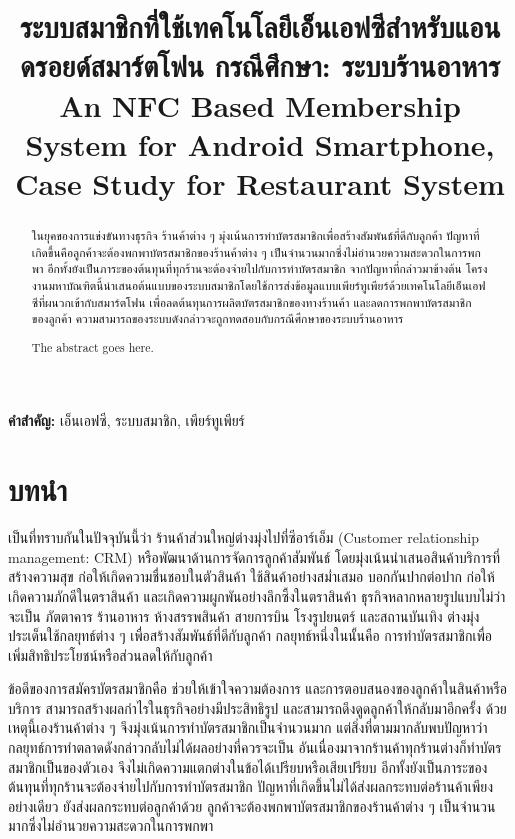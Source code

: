 \documentclass[12pt,a4paper,twocolumn]{article}
\title{ระบบสมาชิกที่ใช้เทคโนโลยีเอ็นเอฟซีสำหรับแอนดรอยด์สมาร์ตโฟน กรณีศึกษา: ระบบร้านอาหาร\\An NFC Based Membership System for Android Smartphone,\\Case Study for Restaurant System}
\author{}
\date{}
\renewcommand\abstractname{บทคัดย่อ}
\begin{document}
\maketitle
\thispagestyle{empty}
\pagestyle{empty}

\begin{abstract}
ในยุคของการแข่งขันทางธุรกิจ ร้านค้าต่าง ๆ มุ่งเน้นการทำบัตรสมาชิกเพื่อสร้างสัมพันธ์ที่ดีกับลูกค้า ปัญหาที่เกิดขึ้นคือลูกค้าจะต้องพกพาบัตรสมาชิกของร้านค้าต่าง ๆ เป็นจำนวนมากซึ่งไม่อำนวยความสะดวกในการพกพา อีกทั้งยังเป็นภาระของต้นทุนที่ทุกร้านจะต้องจ่ายไปกับการทำบัตรสมาชิก จากปัญหาที่กล่าวมาข้างต้น โครงงานมหาบัณฑิตนี้นำเสนอต้นแบบของระบบสมาชิกโดยใช้การส่งข้อมูลแบบเพียร์ทูเพียร์ด้วยเทคโนโลยีเอ็นเอฟซีที่ผนวกเข้ากับสมาร์ตโฟน เพื่อลดต้นทุนการผลิตบัตรสมาชิกของทางร้านค้า และลดการพกพาบัตรสมาชิกของลูกค้า ความสามารถของระบบดังกล่าวจะถูกทดสอบกับกรณีศึกษาของระบบร้านอาหาร
\end{abstract}

\renewcommand\abstractname{Abstract}
\begin{abstract}
The abstract goes here.
\end{abstract}

\noindent \textbf{คำสำคัญ:} เอ็นเอฟซี, ระบบสมาชิก, เพียร์ทูเพียร์


\section{บทนำ}
เป็นที่ทราบกันในปัจจุบันนี้ว่า ร้านค้าส่วนใหญ่ต่างมุ่งไปที่ซีอาร์เอ็ม (Customer relationship management: CRM) หรือพัฒนาด้านการจัดการลูกค้าสัมพันธ์ โดยมุ่งเน้นนำเสนอสินค้าบริการที่สร้างความสุข ก่อให้เกิดความชื่นชอบในตัวสินค้า ใช้สินค้าอย่างสม่ำเสมอ บอกกันปากต่อปาก ก่อให้เกิดความภักดีในตราสินค้า และเกิดความผูกพันอย่างลึกซึ้งในตราสินค้า ธุรกิจหลากหลายรูปแบบไม่ว่าจะเป็น ภัตตาคาร ร้านอาหาร ห้างสรรพสินค้า สายการบิน โรงรูปยนตร์ และสถานบันเทิง ต่างมุ่งประเด็นใช้กลยุทธ์ต่าง ๆ เพื่อสร้างสัมพันธ์ที่ดีกับลูกค้า กลยุทธ์หนึ่งในนั้นคือ การทำบัตรสมาชิกเพื่อเพิ่มสิทธิประโยชน์หรือส่วนลดให้กับลูกค้า

ข้อดีของการสมัครบัตรสมาชิกคือ ช่วยให้เข้าใจความต้องการ และการตอบสนองของลูกค้าในสินค้าหรือบริการ สามารถสร้างผลกําไรในธุรกิจอย่างมีประสิทธิรูป และสามารถดึงดูดลูกค้าให้กลับมาอีกครั้ง ด้วยเหตุนี้เองร้านค้าต่าง ๆ จึงมุ่งเน้นการทำบัตรสมาชิกเป็นจำนวนมาก แต่สิ่งที่ตามมากลับพบปัญหาว่ากลยุทธ์การทำตลาดดังกล่าวกลับไม่ได้ผลอย่างที่ควรจะเป็น อันเนื่องมาจากร้านค้าทุกร้านต่างก็ทำบัตรสมาชิกเป็นของตัวเอง จึงไม่เกิดความแตกต่างในข้อได้เปรียบหรือเสียเปรียบ อีกทั้งยังเป็นภาระของต้นทุนที่ทุกร้านจะต้องจ่ายไปกับการทำบัตรสมาชิก ปัญหาที่เกิดขึ้นไม่ได้ส่งผลกระทบต่อร้านค้าเพียงอย่างเดียว  ยังส่งผลกระทบต่อลูกค้าด้วย ลูกค้าจะต้องพกพาบัตรสมาชิกของร้านค้าต่าง ๆ เป็นจำนวนมากซึ่งไม่อำนวยความสะดวกในการพกพา
\end{document}
